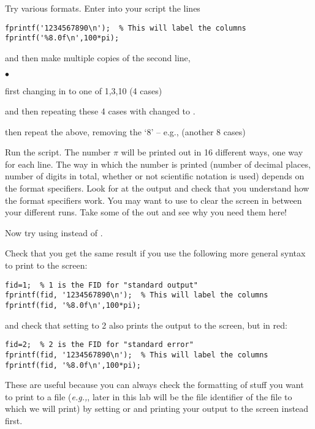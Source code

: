 \documentclass[letterpaper]{article}
\newcounter{lnum}
\newenvironment{abbrevlist}%
  {\begin{list}{$\bullet$}{\setlength{\leftmargin}{2em}%
               \setlength{\itemindent}{0em}%
               \setlength{\itemsep}{0pt}%
               \setlength{\parsep}{0pt}%
               \setlength{\topsep}{2pt}%
               \usecounter{lnum} } }{\end{list}}
\begin{document}
\begin{enumerate}
\item Try various formats.  Enter into your  script the lines
\begin{lstlisting}
fprintf('1234567890\n');  % This will label the columns
fprintf('%8.0f\n',100*pi);
\end{lstlisting}
and then make multiple copies of the second line, 
\begin{abbrevlist}
\item first changing  in  to one of 1,3,10 (4 cases)
\item and then repeating these 4 cases with  changed to .
\item then repeat the above, removing the `8' -- e.g.,  (another 8 cases)
\end{abbrevlist}
Run the script.  The number $\pi$ will be printed out in 16 different
ways, one way for each  line. The way in which the number is
printed  (number of decimal places, number of digits in total,
whether or not scientific notation is used) depends on the
format specifiers. Look for at the output and check that you understand how the format specifiers work.
You may want to use  to clear the screen in between your different runs.
 Take some of the \mcode{\\n} out and see why you need them here!  
 
Now try using  instead of .
 
\item Check that you get the same result if you use the following more general syntax to print to the screen:

\begin{lstlisting}
fid=1;  % 1 is the FID for "standard output"
fprintf(fid, '1234567890\n');  % This will label the columns
fprintf(fid, '%8.0f\n',100*pi);
\end{lstlisting}

and check that setting  to 2 also prints the output to the screen, but in red:

\begin{lstlisting}
fid=2;  % 2 is the FID for "standard error"
fprintf(fid, '1234567890\n');  % This will label the columns
fprintf(fid, '%8.0f\n',100*pi);
\end{lstlisting}

These are useful because you can always check the formatting of stuff you want to print to a file  ({\it e.g.,},  later in this lab  will be the file identifier of the file to which we will print) by setting  or  and printing your output to the screen instead first.



\end{enumerate}
\end{document}
